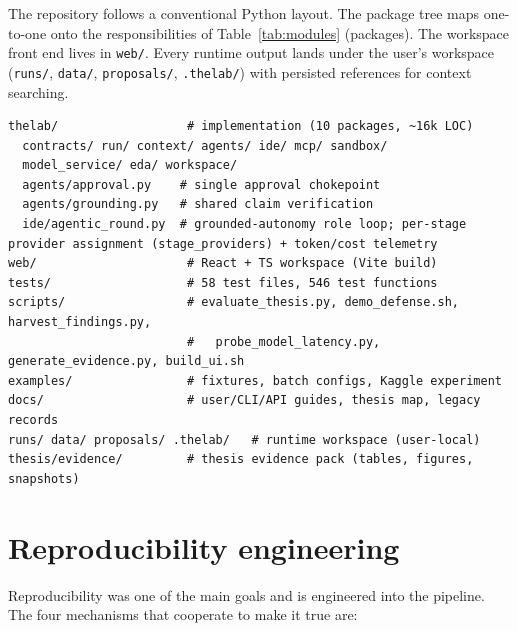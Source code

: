 The repository follows a conventional Python layout. The package tree maps one-to-one onto the responsibilities of Table~\ref{tab:modules} (packages). The workspace front end lives in \texttt{web/}. Every runtime output lands under the user's workspace (\texttt{runs/}, \texttt{data/}, \texttt{proposals/}, \texttt{.thelab/}) with persisted references for context searching.

\begin{lstlisting}[language={}, caption={Repository layout (top level, abridged).}, label={lst:layout}, style=cli]
thelab/                  # implementation (10 packages, ~16k LOC)
  contracts/ run/ context/ agents/ ide/ mcp/ sandbox/
  model_service/ eda/ workspace/
  agents/approval.py    # single approval chokepoint
  agents/grounding.py   # shared claim verification
  ide/agentic_round.py  # grounded-autonomy role loop; per-stage provider assignment (stage_providers) + token/cost telemetry
web/                     # React + TS workspace (Vite build)
tests/                   # 58 test files, 546 test functions
scripts/                 # evaluate_thesis.py, demo_defense.sh, harvest_findings.py,
                         #   probe_model_latency.py, generate_evidence.py, build_ui.sh
examples/                # fixtures, batch configs, Kaggle experiment
docs/                    # user/CLI/API guides, thesis map, legacy records
runs/ data/ proposals/ .thelab/   # runtime workspace (user-local)
thesis/evidence/         # thesis evidence pack (tables, figures, snapshots)
\end{lstlisting}

\section{Reproducibility engineering}
\label{sec:reprowork}

Reproducibility was one of the main goals and is engineered into the pipeline. The four mechanisms that cooperate to make it true are:

